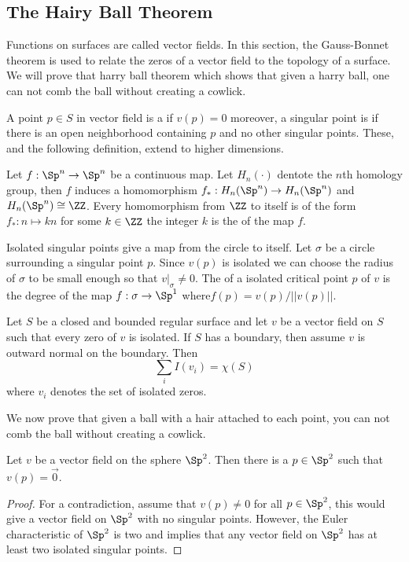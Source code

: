 \subsection{The Hairy Ball Theorem}
\label{sec:hairy-ball}

Functions on surfaces are called vector fields.
In this section, the Gauss-Bonnet theorem is used
to relate the zeros of a vector field to the topology of a surface.
We will prove that harry ball theorem which shows that 
given a harry ball, one
can not comb the ball without creating a cowlick.






A point $p\in S$ in vector field is a  if $v(p)=0$
moreover, a singular point is  if there is an open neighborhood
containing $p$ and no other singular points. These, and the following definition,
extend to higher dimensions.

Let $f:\Sp^n\to \Sp^n$ be a continuous map. Let $H_n(\cdot)$ dentote  
the $n$th  homology group, then $f$ induces a homomorphism
$f_*:H_n(\Sp^n)\to  H_n(\Sp^n)$ and  $H_n(\Sp^n)\cong \ZZ$.
 Every homomorphism from $\ZZ$ to itself is of the form $f_*:n\mapsto kn$ for some 
$k\in \ZZ$ the integer $k$ is the  of the map $f$.

Isolated singular points give a map from the circle to itself.
Let $\sigma$ be a circle surrounding a singular point $p$.
Since $v(p)$ is isolated we can choose the radius of $\sigma$ to be 
small enough so that $v|_\sigma\neq 0$. 
The  of a isolated critical point $p$ of $v$ is the degree
of the map $f:\sigma\to \Sp^1$ where$f(p)=v(p)/||v(p)||$.





\begin{theorem}\label{thm:poincare-hopf}
	Let $S$ be a closed and bounded regular surface and let $v$ be a vector field
	on $S$ such that every zero of $v$ is isolated. If $S$ has a boundary, 
	then assume $v$ is outward normal on the boundary. Then
	$$\sum_iI(v_i)=\chi(S)$$
	where $v_i$ denotes the set of isolated zeros.
	
\end{theorem}

We now prove that given a ball with a hair attached to each point, you can not
comb the ball without creating a cowlick.

\begin{theorem}\label{thm:harry-ball}
	Let $v$ be a vector field on the sphere $\Sp^2$.
	Then there is a $p\in \Sp^2$ such that $v(p)=\vec{0}$.
\end{theorem}

\begin{proof}
	For a contradiction, assume that $v(p)\neq 0$ for all  $p\in \Sp^2$,
	this would give a vector field on $\Sp^2$ with no singular points.
	However, the Euler characteristic of $\Sp^2$ is two and
	 implies that any vector field on $\Sp^2$ has at
	least two isolated singular points.
	
\end{proof} 
